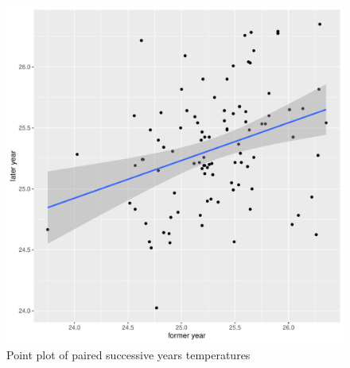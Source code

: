 \documentclass[12pt]{article}
\begin{document}
  \begin{figure}
    \centering
    \includegraphics[scale=0.5]{../sandbox/TAutoCorr.pdf}
    \caption{Point plot of paired successive years temperatures}
  \end{figure}
  
\end{document}
